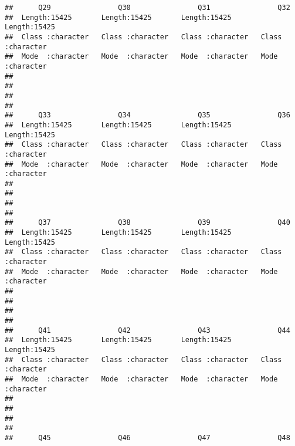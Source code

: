 \documentclass[
]{article}
\begin{document}
\begin{verbatim}
##      Q29                Q30                Q31                Q32           
##  Length:15425       Length:15425       Length:15425       Length:15425      
##  Class :character   Class :character   Class :character   Class :character  
##  Mode  :character   Mode  :character   Mode  :character   Mode  :character  
##                                                                             
##                                                                             
##                                                                             
##                                                                             
##      Q33                Q34                Q35                Q36           
##  Length:15425       Length:15425       Length:15425       Length:15425      
##  Class :character   Class :character   Class :character   Class :character  
##  Mode  :character   Mode  :character   Mode  :character   Mode  :character  
##                                                                             
##                                                                             
##                                                                             
##                                                                             
##      Q37                Q38                Q39                Q40           
##  Length:15425       Length:15425       Length:15425       Length:15425      
##  Class :character   Class :character   Class :character   Class :character  
##  Mode  :character   Mode  :character   Mode  :character   Mode  :character  
##                                                                             
##                                                                             
##                                                                             
##                                                                             
##      Q41                Q42                Q43                Q44           
##  Length:15425       Length:15425       Length:15425       Length:15425      
##  Class :character   Class :character   Class :character   Class :character  
##  Mode  :character   Mode  :character   Mode  :character   Mode  :character  
##                                                                             
##                                                                             
##                                                                             
##                                                                             
##      Q45                Q46                Q47                Q48           

\end{verbatim}
\end{document}
